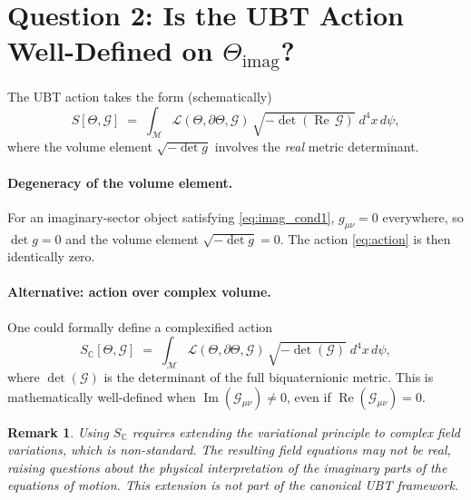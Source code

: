 \documentclass[12pt]{article}
\newtheorem{remark}{Remark}
\begin{document}
\section{Question 2: Is the UBT Action Well-Defined on
$\Theta_\mathrm{imag}$?}

The UBT action takes the form (schematically)
\begin{equation}
  S[\Theta, \mathcal{G}]
  \;=\; \int_{\mathcal{M}} \mathcal{L}(\Theta, \partial\Theta, \mathcal{G})
  \,\sqrt{-\det(\operatorname{Re}\,\mathcal{G})}\;d^4x\,d\psi,
  \label{eq:action}
\end{equation}
where the volume element $\sqrt{-\det g}$ involves the \emph{real}
metric determinant.

\paragraph{Degeneracy of the volume element.}
For an imaginary-sector object satisfying \eqref{eq:imag_cond1},
$g_{\mu\nu} = 0$ everywhere, so $\det g = 0$ and the volume element
$\sqrt{-\det g} = 0$.  The action \eqref{eq:action} is then
identically zero.

\paragraph{Alternative: action over complex volume.}
One could formally define a complexified action
\begin{equation}
  S_\mathbb{C}[\Theta, \mathcal{G}]
  \;=\; \int_{\mathcal{M}} \mathcal{L}(\Theta, \partial\Theta, \mathcal{G})
  \,\sqrt{-\det(\mathcal{G})}\;d^4x\,d\psi,
\end{equation}
where $\det(\mathcal{G})$ is the determinant of the full biquaternionic
metric.  This is mathematically well-defined when
$\operatorname{Im}(\mathcal{G}_{\mu\nu}) \neq 0$, even if
$\operatorname{Re}(\mathcal{G}_{\mu\nu}) = 0$.

\begin{remark}
Using $S_\mathbb{C}$ requires extending the variational principle to
complex field variations, which is non-standard.  The resulting
field equations may not be real, raising questions about the physical
interpretation of the imaginary parts of the equations of motion.
This extension is not part of the canonical UBT framework.
\end{remark}
\end{document}

